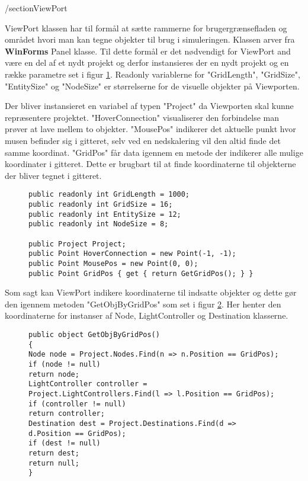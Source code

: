 /section{ViewPort}\label{ViewPort}

ViewPort klassen har til formål at sætte rammerne for brugergrænsefladen og området hvori man kan tegne objekter til brug i simuleringen. Klassen arver fra \textbf{WinForms} Panel klasse. Til dette formål er det nødvendigt for ViewPort and være en del af et nydt projekt og derfor instansieres der en nydt projekt og en række parametre set i figur \ref{ViewportParameters}. Readonly variablerne for "GridLength", "GridSize", "EntitySize" og "NodeSize" er størrelserne for de visuelle objekter på Viewporten.

\vspace{5mm}

Der bliver instansieret en variabel af typen "Project" da Viewporten skal kunne repræsentere projektet. "HoverConnection" visualiserer den forbindelse man prøver at lave mellem to objekter. "MousePos" indikerer det aktuelle punkt hvor musen befinder sig i gitteret, selv ved en nedskalering vil den altid finde det samme koordinat. "GridPos" får data igennem en metode der indikerer alle mulige koordinater i gitteret. Dette er brugbart til at finde koordinaterne til objekterne der bliver tegnet i gitteret.

\begin{figure}[H]
\begin{lstlisting}
public readonly int GridLength = 1000;
public readonly int GridSize = 16;
public readonly int EntitySize = 12;
public readonly int NodeSize = 8;

public Project Project;
public Point HoverConnection = new Point(-1, -1);
public Point MousePos = new Point(0, 0);
public Point GridPos { get { return GetGridPos(); } }
\end{lstlisting}
\caption{}
\label{ViewportParameters}
\end{figure}

Som sagt kan ViewPort indikere koordinaterne til indsatte objekter og dette gør den igennem metoden "GetObjByGridPos" som set i figur \ref{ViewportGetObjByGridPos}. Her henter den koordinaterne for instanser af Node, LightController og Destination klasserne.

\begin{figure}
\begin{lstlisting}
public object GetObjByGridPos()
{
Node node = Project.Nodes.Find(n => n.Position == GridPos);
if (node != null)
return node;
LightController controller = Project.LightControllers.Find(l => l.Position == GridPos);
if (controller != null)
return controller;
Destination dest = Project.Destinations.Find(d => d.Position == GridPos);
if (dest != null)
return dest;
return null;
}
\end{lstlisting}
\caption{}
\label{ViewportGetObjByGridPos}
\end{figure}
